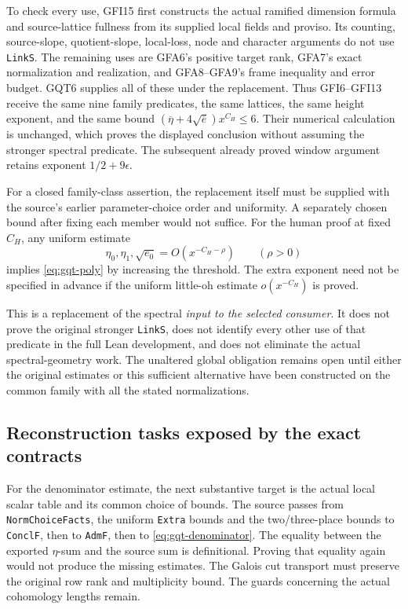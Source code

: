 \documentclass[11pt,a4paper]{article}
\numberwithin{equation}{section}
\theoremstyle{remark}\newtheorem{remark}[theorem]{Remark}
\begin{document}
To check every use, GFI15 first constructs the actual ramified
dimension formula and source-lattice fullness from its supplied
local fields and proviso. Its counting, source-slope,
quotient-slope, local-loss, node and character arguments do not
use \texttt{Link\allowbreak S}. The remaining uses are GFA6's positive
target rank, GFA7's exact normalization and realization, and
GFA8--GFA9's frame inequality and error budget. GQT6 supplies
all of these under the replacement. Thus GFI6--GFI13 receive
the same nine family predicates, the same lattices, the same
height exponent, and the same bound
$(\overline\eta+4\sqrt{\overline e})x^{C_H}\le6$.
Their numerical calculation is unchanged, which proves the
displayed conclusion without assuming the stronger spectral predicate.
The subsequent already
proved window argument retains exponent $1/2+9\epsilon$.

For a closed family-class assertion, the replacement itself must
be supplied with the source's earlier parameter-choice order and
uniformity. A separately chosen bound after fixing each member
would not suffice. For the human proof at fixed $C_H$, any
uniform estimate
\[
 \eta_0,\eta_1,\sqrt{e_0}=O(x^{-C_H-\rho})\qquad(\rho>0)
\]
implies \eqref{eq:gqt-poly} by increasing the threshold.
The extra exponent need not be specified in advance if the
uniform little-oh estimate $o(x^{-C_H})$ is proved.

This is a replacement of the spectral \emph{input to the selected
consumer}. It does not prove the original stronger
\texttt{Link\allowbreak S}, does not identify every other use of that
predicate in the full Lean development, and does not eliminate
the actual spectral-geometry work. The unaltered global
obligation remains open until either the original estimates or
this sufficient alternative have been constructed on the common
family with all the stated normalizations.

\subsection{Reconstruction tasks exposed by the exact contracts}

For the denominator estimate, the next substantive target is the
actual local scalar table and its common choice of bounds. The
source passes from \texttt{Norm\allowbreak Choice\allowbreak Facts}, the uniform
\texttt{Extra} bounds and the two/three-place bounds to
\texttt{Concl\allowbreak F}, then to \texttt{Adm\allowbreak F}, then to
\eqref{eq:gqt-denominator}. The equality between the exported
$\eta$-sum and the source sum is definitional. Proving that equality
again would not produce the missing estimates. The Galois cut
transport must preserve the original row rank and multiplicity
bound. The guards concerning the actual cohomology lengths remain.
\end{document}
